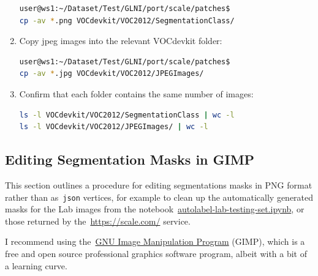 \documentclass[11pt]{article} %
\begin{document}
\begin{enumerate}
\begin{lstlisting}[language=bash, frame=single]
user@ws1:~/Dataset/Test/GLNI/port/scale/patches$ 
cp -av *.png VOCdevkit/VOC2012/SegmentationClass/
\end{lstlisting}

\item Copy jpeg images into the relevant VOCdevkit folder:

\begin{lstlisting}[language=bash, frame=single]
user@ws1:~/Dataset/Test/GLNI/port/scale/patches$ 
cp -av *.jpg VOCdevkit/VOC2012/JPEGImages/
\end{lstlisting}

\item Confirm that each folder contains the same number of images:
\begin{lstlisting}[language=bash, frame=single]
ls -l VOCdevkit/VOC2012/SegmentationClass | wc -l
ls -l VOCdevkit/VOC2012/JPEGImages/ | wc -l
\end{lstlisting}

\end{enumerate}

\subsection{Editing Segmentation Masks in GIMP}
\label{sec:gimp}

This section outlines a procedure for editing segmentations masks in PNG format
rather than as~\texttt{json} vertices, for example to clean up the
automatically generated masks for the Lab images from the
notebook~\href{https://github.com/AngusG/cciw-zebra-mussel/blob/master/labelme/autolabel-lab-testing-set.ipynb}{autolabel-lab-testing-set.ipynb},
 or those returned by the~\url{https://scale.com/} service.

I recommend using the~\href{https://www.gimp.org/}{GNU Image Manipulation
Program} (GIMP), which is a free and open source professional graphics software 
program, albeit with a bit of a learning curve.
\end{document}

